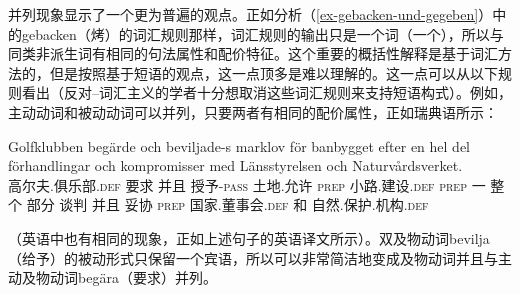     并列现象显示了一个更为普遍的观点。正如分析（\ref{ex-gebacken-und-gegeben}）中的gebacken（烤）的词汇规则那样，词汇规则的输出只是一个词（一个\xzeroc），所以与同类非派生词有相同的句法属性和配价特征。这个重要的概括性解释是基于词汇方法的，但是按照基于短语的观点，这一点顶多是难以理解的。这一点可以从以下规则看出（反对--词汇主义的学者十分想取消这些词汇规则来支持短语构式）。例如，主动动词和被动动词可以并列，只要两者有相同的配价属性，正如瑞典语所示：
\ea
{\raggedright
\gll Golfklubben beg\"arde och beviljade-s marklov f\"or banbygget efter en hel del f\"orhandlingar och kompromisser med L\"ansstyrelsen och 
Naturv\aa rdsverket.\footnotemark\\
高尔夫.俱乐部.\textsc{def} 要求 并且 授予-\textsc{pass} 土地.允许 \textsc{prep} 小路.建设.\textsc{def} \textsc{prep} 一 整个 部分 谈判 并且 妥协 \textsc{prep} 国家.董事会.\textsc{def} 和 自然.保护.机构.\textsc{def} \\
\par}
\z
\noindent
（英语中也有相同的现象，正如上述句子的英语译文所示）。双及物动词bevilja（给予）的被动形式只保留一个宾语，所以可以非常简洁地变成及物动词并且与主动及物动词beg\"ara（要求）并列。

